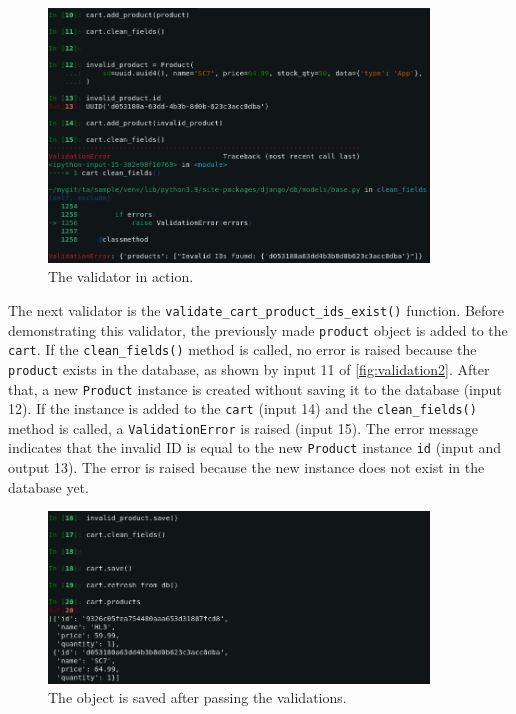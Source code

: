 \begin{figure}
	\centering
    \includegraphics[width=0.90\textwidth]{pics/validation2.png}
	\caption{The  validator in action.}
	\label{fig:validation2}
\end{figure}

The next validator is the \verb|validate_cart_product_ids_exist()| function.
Before demonstrating this validator, the previously made \verb|product| object
is added to the \verb|cart|. If the \verb|clean_fields()| method is called, no
error is raised because the \verb|product| exists in the database, as shown by
input 11 of \autoref{fig:validation2}. After that, a new \verb|Product|
instance is created without saving it to the database (input 12). If the
instance is added to the \verb|cart| (input 14) and the \verb|clean_fields()|
method is called, a \verb|ValidationError| is raised (input 15). The error
message indicates that the invalid ID is equal to the new \verb|Product|
instance \verb|id| (input and output 13). The error is raised because the
new instance does not exist in the database yet.

\begin{figure}
	\centering
    \includegraphics[width=0.90\textwidth]{pics/validation3.png}
	\caption{The  object is saved after passing the validations.}
	\label{fig:validation3}
\end{figure}


